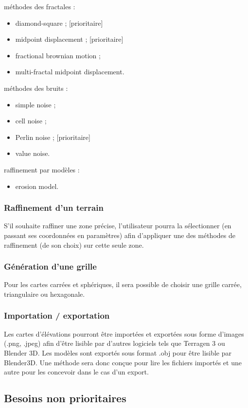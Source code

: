 \noindent méthodes des fractales :
\begin{itemize}
\item diamond-square ; [prioritaire]
\item midpoint displacement ; [prioritaire]
\item fractional brownian motion ;
\item multi-fractal midpoint displacement.
\end{itemize}
méthodes des bruits :
\begin{itemize}
\item simple noise ;
\item cell noise ;
\item Perlin noise ; [prioritaire]
\item value noise.
\end{itemize}
raffinement par modèles :
\begin{itemize}
\item erosion model.
\end{itemize}

\subsubsection{Raffinement d'un terrain}
S'il souhaite raffiner une zone précise, l'utilisateur pourra la sélectionner (en passant ses coordonnées en paramètres) afin d'appliquer une des méthodes de raffinement (de son choix) sur cette seule zone.

\subsubsection {Génération d'une grille}
Pour les cartes carrées et sphériques, il sera possible de choisir une grille carrée, triangulaire ou hexagonale.

\subsubsection{Importation / exportation}
Les cartes d'élévations pourront être importées et exportées sous forme
d'images (.png, .jpeg) afin d'être lisible par d'autres logiciels
tels que Terragen 3 ou Blender 3D. \newline
Les modèles sont exportés sous format .obj pour être lisible par Blender3D.
Une méthode sera donc conçue pour lire les fichiers importés et une autre pour les concevoir dans le cas d'un export. 

\subsection{Besoins non prioritaires}

